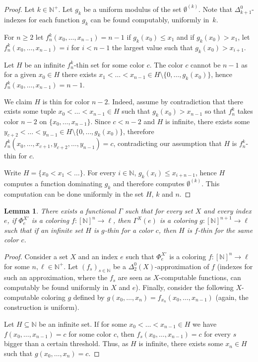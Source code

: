 \documentclass[10pt,a4paper]{article}
\newcommand{\NN}[0]{\mathbb{N}}
\numberwithin{theorem}{section}
\newtheorem{lemma}[theorem]{Lemma}
\begin{document}
\begin{proof}
Let $k\in\NN^+$. Let $g_k$ be a uniform modulus of the set $\emptyset^{(k)}$. Note that $\Delta^0_{k+1}$-indexes for each function $g_k$ can be found computably, uniformly in~$k$. 

For $n \geq 2$ let $f_n^k(x_0, \dots,x_{n-1}) = n - 1$ if $g_k(x_0) \leq x_1$ and if $g_k(x_0) > x_1$, let $f_n^k(x_0, \dots,x_{n-1}) = i$ for $i < n - 1$ the largest value such that $g_k(x_0) > x_{i+1}$.

Let $H$ be an infinite $f_n^k$-thin set for some color $c$. The color $c$ cannot be $n-1$ as for a given $x_0 \in H$ there exists $x_1 <\dots < x_{n-1} \in H \setminus \{0, \dots, g_k(x_0)\}$, hence $f^k_n(x_0, \dots, x_{n-1}) = n-1$.

We claim $H$ is thin for color $n-2$. Indeed, assume by contradiction that there exists some tuple $x_0 < \dots < x_{n-1} \in H$ such that $g_k(x_0) > x_{n-1}$ so that $f^k_n$ takes color $n-2$ on $\{x_0, \dots, x_{n-1}\}$. Since $c < n-2$ and $H$ is infinite, there exists some $y_{c+2}< \dots < y_{n-1} \in H \setminus \{0, \dots ,g_k(x_0)\}$, therefore $f^k_n(x_0, \dots, x_{c+1},y_{c+2}, \dots, y_{n-1}) = c$, contradicting our assumption that $H$ is $f_n^k$-thin for $c$.

Write $H = \{x_0 < x_1 < \dots \}$. For every $i \in \NN$, $g_k(x_i) \leq x_{i + n - 1}$, hence $H$ computes a function dominating $g_k$ and therefore computes $\emptyset^{(k)}$. This computation can be done uniformly in the set $H$, $k$ and $n$. 
\end{proof}


\begin{lemma}
    There exists a functional $\Gamma$ such that for every set $X$ and every index $e$, if $\Phi_e^{X'}$ is a coloring $f : [\NN]^n \to \ell$, then $\Gamma^X(e)$ is a coloring $g : [\NN]^{n+1} \to \ell$ such that if an infinite set $H$ is $g$-thin for a color $c$, then $H$ is $f$-thin for the same color $c$. 
\end{lemma}

\begin{proof}
Consider a set $X$ and an index $e$ such that $\Phi_e^{X'}$ is a coloring $f : [\NN]^n \to \ell$ for some $n, \ell \in \NN^+$. Let $(f_s)_{s\in \NN}$ be a $\Delta_2^0(X)$-approximation of $f$ (indexes for such an approximation, where the $f_s$ are seen as $X$-computable functions, can computably be found uniformly in $X$ and $e$). Finally, consider the following $X$-computable coloring $g$ defined by $g(x_0, \dots, x_{n}) = f_{x_n}(x_0, \dots, x_{n-1})$ (again, the construction is uniform).

Let $H \subseteq \NN$ be an infinite set. If for some $x_0 < \dots < x_{n-1} \in H$ we have $f(x_0, \dots, x_{n-1}) = c$ for some color $c$, then $f_s(x_0, \dots, x_{n-1}) = c$ for every $s$ bigger than a certain threshold. Thus, as $H$ is infinite, there exists some $x_n \in H$ such that $g(x_0, \dots, x_n) = c$.  
\end{proof}
\end{document}
